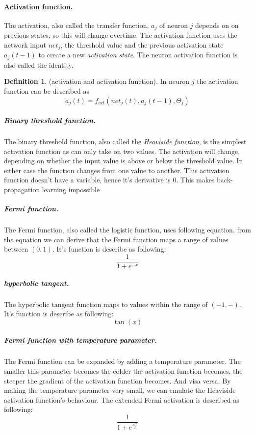 \documentclass[pdftex,a4paper,12pt,twoside]{report}
\theoremstyle{plain} \newtheorem{theorem}{Theorem} \newtheorem{proposition}{Proposition} \newtheorem{lemma}{Lemma} \newtheorem*{corollary}{Corollary}
\theoremstyle{definition} \newtheorem{definition}{Definition} \newtheorem{conjecture}{Conjecture} \newtheorem*{example}{Example} \newtheorem{algorithm}{Algorithm}
\theoremstyle{remark} \newtheorem*{remark}{Remark} \newtheorem*{note}{Note} \newtheorem{case}{Case}
\begin{document}
\paragraph{Activation function.}
\label{par:activationfunction}
The activation, also called the transfer function, $a_j$ of neuron $j$ depends on on previous states, so this will change overtime. The activation function uses the network input $net_j$, the threshold value and the previous activation state $a_j(t-1)$ to create a new \emph{activation state}. The neuron activation function is also called the identity.
\begin{definition}
(activation and activation function). In neuron $j$ the activation function can be described as
\begin{equation}
a_j(t) = f _{act}(net_j(t),a_j(t-1),\Theta_j)
\end{equation}
\end{definition}
\subparagraph{Binary threshold function.}
The binary threshold function, also called the \emph{Heaviside function}, is the simplest activation function as can only take on two values. The activation will change, depending on whether the input value is above or below the threshold value. In either case the function changes from one value to another. This activation function doesn't have a variable, hence it's derivative is 0. This makes back-propagation learning impossible 
\subparagraph{Fermi function.}
The Fermi function, also called the logistic function, uses following equation. from the equation we can derive that the Fermi function maps a range of values between $(0,1)$. It's function is describe as following:
\begin{equation}
\displaystyle \frac{1}{1+e^{-x}}
\end{equation}
\subparagraph{hyperbolic tangent.}
The hyperbolic tangent function maps to values within the range of $(-1,-)$. It's function is describe as following:
\begin{equation}
\tan(x)
\end{equation}
\subparagraph{Fermi function with temperature parameter.}
The Fermi function can be expanded by adding a temperature parameter. The smaller this parameter becomes the colder the activation function becomes, the steeper the gradient of the activation function becomes. And visa versa. By making the temperature parameter very small, we can emulate the Heaviside activation function's behaviour. The extended Fermi activation is described as following:
\begin{equation}
\displaystyle \frac{1}{1+e^{\frac{-x}{T}}}
\end{equation}
\end{document}
